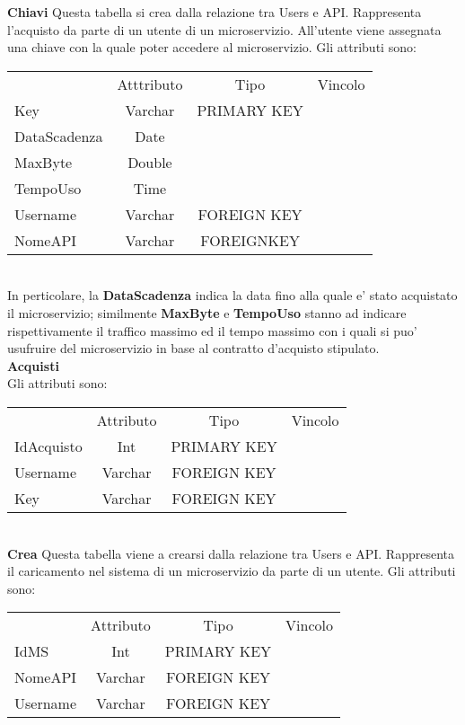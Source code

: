 {{		\textbf{Chiavi}
			Questa tabella si crea dalla relazione tra Users e API. Rappresenta l'acquisto da parte di un utente di un microservizio. All'utente viene assegnata una chiave con la quale poter accedere al microservizio. Gli attributi sono:
			\begin{center}
			\begin{tabular}{lccc}
				&Atttributo&Tipo&Vincolo\\
				Key&Varchar&PRIMARY KEY\\
				DataScadenza&Date& \\
				MaxByte&Double& \\
				TempoUso&Time& \\
				Username&Varchar&FOREIGN KEY\\
				NomeAPI&Varchar&FOREIGNKEY\\			
			\end{tabular}
			\end{center}\\
			In perticolare, la \textbf{DataScadenza} indica la data fino alla quale e' stato acquistato il microservizio; similmente \textbf{MaxByte} e \textbf{TempoUso} stanno ad indicare rispettivamente il traffico massimo ed il tempo massimo con i quali si puo' usufruire del microservizio in base al contratto d'acquisto stipulato.\\
			
		\textbf{Acquisti}\\
		Gli attributi sono: \\
		\begin{center}
		\begin{tabular}{lccc}
			&Attributo&Tipo&Vincolo\\
			IdAcquisto&Int&PRIMARY KEY\\
			Username&Varchar&FOREIGN KEY\\
			Key&Varchar&FOREIGN KEY\\
		\end{tabular}
		\end{center}\\
			
		\textbf{Crea}
			Questa tabella viene a crearsi dalla relazione tra Users e API. Rappresenta il caricamento nel sistema di un microservizio da parte di un utente. Gli attributi sono:
			\begin{center}
			\begin{tabular}{lccc}
				&Attributo&Tipo&Vincolo\\
				IdMS&Int&PRIMARY KEY\\
				NomeAPI&Varchar&FOREIGN KEY\\
				Username&Varchar&FOREIGN KEY\\			
			\end{tabular}
			\end{center}
			
		}
	
}